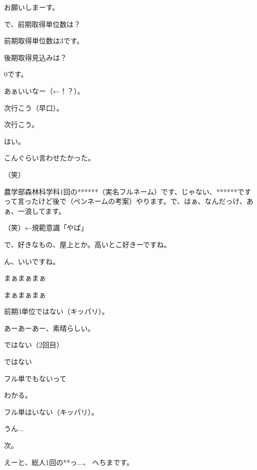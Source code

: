 \begin{multicols}{3}
{        お願いしまーす。

        で、前期取得単位数は？

        前期取得単位数は3です。

        後期取得見込みは？

        0です。

        あぁいいなー（←！？）。

        次行こう（早口）。

        次行こう。

        はい。

        こんぐらい言わせたかった。

        （笑）

        農学部森林科学科1回の******（実名フルネーム）です、じゃない、******ですって言ったけど後で（ペンネームの考案）やります。で、はぁ、なんだっけ、あぁ、一浪してます。

        （笑）←規範意識「やば」

        で、好きなもの、屋上とか。高いとこ好きーですね。

        ん、いいですね。

    


    

        まぁまぁまぁ

        まぁまぁまぁ

        前期3単位ではない（キッパリ）。

        あーあーあー、素晴らしい。

        ではない（2回目）

        ではない

        フル単でもないって

        わかる。

        フル単はいない（キッパリ）。

        うん...

        次。

        えーと、総人1回の**っ...、 へちまです。

}
\end{multicols}
